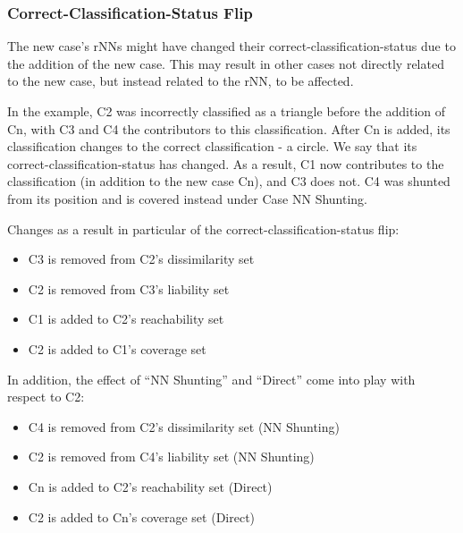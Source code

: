 \documentclass[a4paper,11pt]{report}
\begin{document}
\subsubsection{Correct-Classification-Status Flip}
The new case's rNNs might have changed their correct-classification-status due to the addition of the new case. This may result in other cases not directly related to the new case, but instead related to the rNN, to be affected.

In the example, C2 was incorrectly classified as a triangle before the addition of Cn, with C3 and C4 the contributors to this classification. After Cn is added, its classification changes to the correct classification - a circle. We say that its correct-classification-status has changed. As a result, C1 now contributes to the classification (in addition to the new case Cn), and C3 does not. C4 was shunted from its position and is covered instead under Case NN Shunting.

Changes as a result in particular of the correct-classification-status flip:
\begin{itemize}
	\item C3 is removed from C2's dissimilarity set
	\item C2 is removed from C3's liability set
	\item C1 is added to C2's reachability set
	\item C2 is added to C1's coverage set
\end{itemize}

In addition, the effect of ``NN Shunting'' and ``Direct'' come into play with respect to C2:
\begin{itemize}
	\item C4 is removed from C2's dissimilarity set (NN Shunting)
	\item C2 is removed from C4's liability set (NN Shunting)
	\item Cn is added to C2's reachability set (Direct)
	\item C2 is added to Cn's coverage set (Direct)
\end{itemize}
\end{document}
